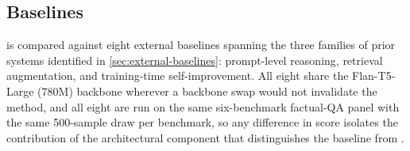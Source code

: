 \subsection{Baselines}
\label{sec:baselines}

\caem{} is compared against eight external baselines spanning the
three families of prior systems identified in
\cref{sec:external-baselines}: prompt-level reasoning, retrieval
augmentation, and training-time self-improvement. All eight share the
\mbox{Flan-T5-Large} (780M) backbone wherever a backbone swap would not
invalidate the method, and all eight are run on the same six-benchmark
factual-QA panel with the same 500-sample draw per benchmark, so any
difference in score isolates the contribution of the architectural
component that distinguishes the baseline from \caem{}.

